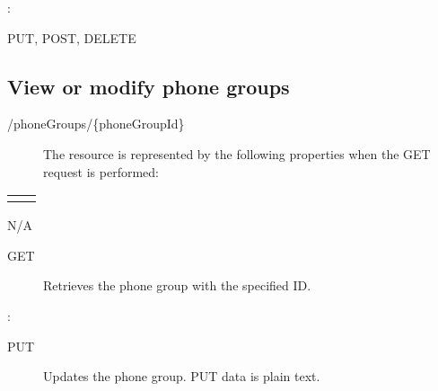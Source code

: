 \documentclass[letterpaper,10pt,english]{sphinxmanual}
\begin{document}
:

\begin{sphinxVerbatim}[commandchars=\\\{\}]
\end{sphinxVerbatim}

 PUT, POST, DELETE


\subsection{View or modify phone groups}
\label{\detokenize{restapi:view-or-modify-phone-groups}}
 /phoneGroups/\{phoneGroupId\}
\begin{description}
\item[{}] \leavevmode
The resource is represented by the following properties when the GET request is performed:

\end{description}


\begin{savenotes}\sphinxattablestart
\centering
\begin{tabulary}{\linewidth}[t]{|T|T|}
\hline

&
\\
\hline&\\
\hline
\end{tabulary}
\par
\sphinxattableend\end{savenotes}

 N/A
\begin{description}
\item[{ GET}] \leavevmode
Retrieves the phone group with the specified ID.

\end{description}

:

\begin{sphinxVerbatim}[commandchars=\\\{\}]
\end{sphinxVerbatim}
\begin{description}
\item[{ PUT}] \leavevmode
Updates the phone group. PUT data is plain text.

\end{description}
\end{document}
